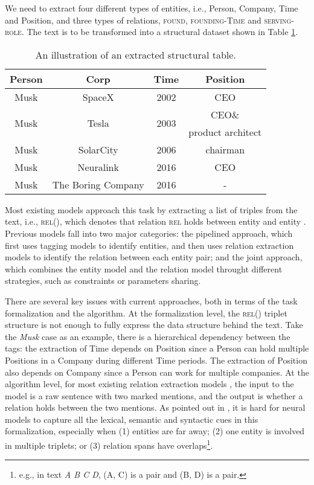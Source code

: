 \documentclass[11pt,a4paper]{article}
\newcommand{\rel}{\textsc{rel}\xspace}
\begin{document}
We need to extract four different types of entities, i.e., Person, Company, Time and Position, and three types of relations, \textsc{found}, \textsc{founding-Time} and \textsc{serving-role}.
The text is to be 
transformed into a structural dataset  shown in Table \ref{illustration}. 
\begin{table}
\small
\begin{tabular}{cccc}\hline
Person& Corp& Time & Position \\\hline
Musk& SpaceX & 2002 & CEO \\
\multirow{ 2}{*}{Musk}&\multirow{ 2}{*}{Tesla} &\multirow{ 2}{*}{ 2003} & CEO\&   \\
& & & product architect \\
Musk & SolarCity & 2006 & chairman  \\
Musk & Neuralink  & 2016 & CEO \\
Musk & The Boring Company & 2016 & - \\\hline
\end{tabular}
\caption{An illustration of an extracted structural table. }
\label{illustration}
\end{table}

Most existing models approach this task by extracting a list of triples from the text, i.e., \textsc{rel()}, which denotes that 
 relation \rel holds
  between entity  and entity .  
  Previous models fall into two major categories: 
the pipelined approach, which  first uses tagging models to identify entities, and
then uses relation extraction models  to identify the relation between each entity pair; and
the joint approach, which
combines the entity model and the relation model throught different strategies, 
such as 
 constraints or
 parameters sharing. 

There are several key issues with current approaches, both in terms of the task formalization and the algorithm. 
At the formalization level, the \textsc{rel()} triplet structure is not enough to fully express the data structure behind the text. 
Take the {\it Musk} case as an example, there is a hierarchical dependency between the tags: 
the extraction of Time depends on Position since a Person can hold multiple Positions in a Company during different Time periods. 
The extraction of Position also depends on Company since a Person can work for multiple companies. 
At the algorithm level, 
for most existing relation extraction models \cite{miwa2016end,wang2016relation,ye2016jointly}, 
the input to the  model is a raw sentence with two marked mentions, and the output is whether a relation holds between the two mentions. 
As pointed out in , it is hard for neural models to capture all the lexical, semantic and syntactic cues in this formalization, especially when 
(1) entities are far away; 
(2) one entity is involved in multiple triplets;  or (3) relation spans have overlaps\footnote{e.g., in text {\it A B C D}, (A, C) is a pair and (B, D) is a pair.}.
\end{document}
